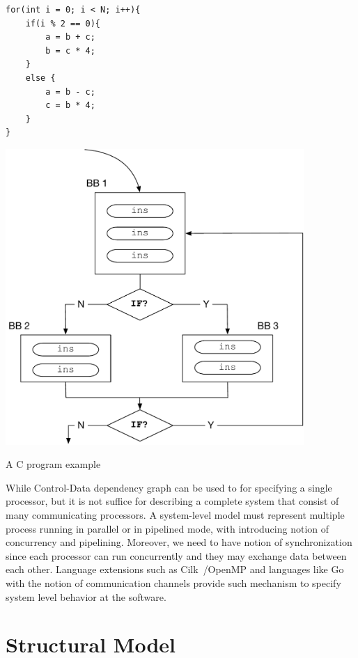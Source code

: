 \begin{listing}[!h]
    \begin{minipage}{0.5\textwidth}
        \begin{verbatim}
for(int i = 0; i < N; i++){
    if(i % 2 == 0){
        a = b + c;
        b = c * 4;
    }
    else {
        a = b - c;
        c = b * 4;
    }
}
        \end{verbatim}
    \end{minipage}
    \begin{minipage}{0.5\textwidth}
       \includegraphics[width=0.85\textwidth]{figures/Introduction/CFG.pdf}
    \end{minipage}
    \caption{A C program example}
    \label{fig:c_example}
\end{listing}


While Control-Data dependency graph can be used to for specifying a single processor, but it is not suffice for describing a complete system that consist of many communicating processors.
A system-level model must represent multiple process running in parallel or in pipelined mode, with introducing notion of concurrency and pipelining.
Moreover, we need to have notion of synchronization since each processor can run concurrently and they may exchange data between each other.
Language extensions such as Cilk~\cite{cilk}/OpenMP and languages like Go with the notion of communication channels provide such mechanism to specify system level behavior at the software.

\section{Structural Model}

